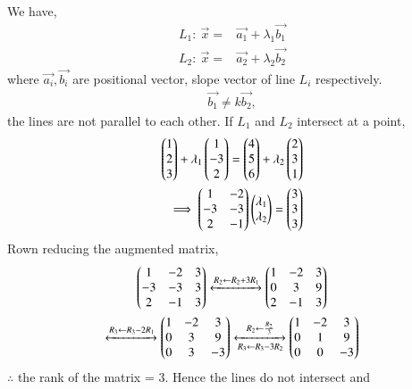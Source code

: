 We have,
\begin{align}
    \label{sep/2/23/eq:3}                       
    L_{1}: \: \Vec{x}={}&\Vec{a_{1}}+\lambda_{1}\Vec{b_{1}}\\
    \label{sep/2/23/eq:4}
    L_{2}: \: \Vec{x}={}&\Vec{a_{2}}+\lambda_{2}\Vec{b_{2}}
\end{align}
where $\Vec{a_{i}},\Vec{b_{i}}$ are positional vector, slope vector of line $L_{i}$ respectively.\\
\begin{align}
\Vec{b_{1}}\neq k \Vec{b_{2}},
\end{align}
the lines are not parallel to each other.
If $L_{1}$ and $L_{2}$ intersect at a point,
\begin{align}
    \label{sep/2/23/eq:5}
    \begin{pmatrix}1 \\ 2\\ 3 \end{pmatrix} +\lambda_{1}\begin{pmatrix}1 \\ -3 \\ 2\end{pmatrix} = \begin{pmatrix}4 \\ 5\\ 6\end{pmatrix} + \lambda_{2}\begin{pmatrix}2 \\ 3 \\ 1\end{pmatrix} \\
    \label{sep/2/23/eq:6}
\implies 
    \begin{pmatrix}1 & -2\\ -3 &-3 \\ 2 & -1\end{pmatrix}\begin{pmatrix}\lambda_{1}\\ \lambda_{2}\end{pmatrix}=
    \begin{pmatrix}3 \\ 3\\ 3 \end{pmatrix}
\end{align}
Rown reducing the augmented matrix,
\begin{multline}
    \begin{pmatrix}1 & -2 & 3\\ -3 &-3 & 3\\ 2 & -1 & 3\end{pmatrix} \xleftrightarrow{R_{2}\leftarrow R_{2}+3R_{1}}
     \begin{pmatrix}1 & -2 & 3\\ 0 &3 & 9\\ 2 & -1 & 3\end{pmatrix}\\
     \xleftrightarrow{R_{3}\leftarrow R_{3}-2R_{1}}
     \begin{pmatrix}1 & -2 & 3\\ 0 &3 & 9\\ 0 & 3 & -3\end{pmatrix}
   \xleftrightarrow[R_{3}\leftarrow R_{3}-3R_{2}]{R_{2}\leftarrow\frac{R_{2}}{3}}
    \begin{pmatrix}1 & -2 & 3\\ 0 & 1 & 9\\ 0 & 0 & -3\end{pmatrix}
\end{multline}
$\therefore$ the rank of the matrix = 3. Hence the lines do not intersect and 
